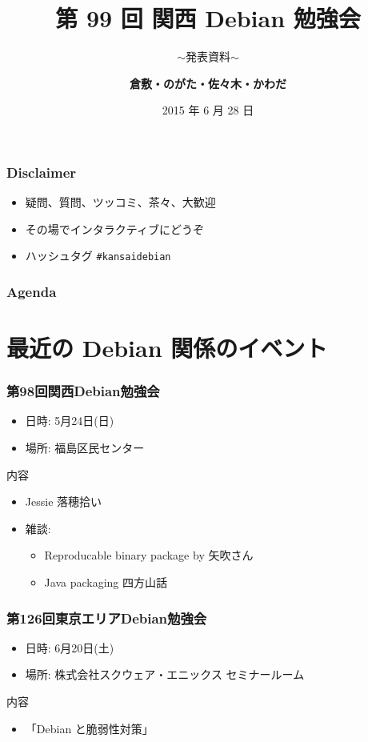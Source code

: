 \documentclass[cjk,dvipdfmx,10pt,compress,%
hyperref={bookmarks=true,bookmarksnumbered=true,bookmarksopen=false,%
  colorlinks=false,%
  pdftitle={第 99 回 関西 Debian 勉強会},%
  pdfauthor={倉敷・のがた・佐々木・かわだ},%
  pdfsubject={資料},%
}]{beamer}
\title{第 99 回 関西 Debian 勉強会}
\subtitle{$\sim$発表資料$\sim$}
\author[%
倉敷, のがた, 佐々木, かわだ]{%
  {\large{\textbf{倉敷・のがた・佐々木・かわだ}}}}
\institute[Debian JP]{\normalsize{関西 Debian 勉強会}}
\date{{\small{2015 年 6 月 28 日}}}
\begin{document}
\settitleslide
\begin{frame}
  \titlepage
\end{frame}
\setdefaultslide

\begin{frame}[fragile]
  \frametitle{Disclaimer}
  \begin{itemize}
  \item 疑問、質問、ツッコミ、茶々、\alert{大歓迎}
  \item その場でインタラクティブにどうぞ
  \item ハッシュタグ \texttt{\#kansaidebian}
  \end{itemize}
\end{frame}

\begin{frame}[fragile]
\frametitle{Agenda}

\tableofcontents

\end{frame}

\section{最近の Debian 関係のイベント}


\begin{frame}[fragile]
  \frametitle{第98回関西Debian勉強会}
  \begin{itemize}
  \item 日時: 5月24日(日)
  \item 場所: 福島区民センター
  \end{itemize}
  \begin{block}{内容}
    \begin{itemize}
    \item Jessie 落穂拾い
    \item 雑談:
      \begin{itemize}
      \item Reproducable binary package by 矢吹さん
      \item Java packaging 四方山話
      \end{itemize}
    \end{itemize}
  \end{block}
\end{frame}

\begin{frame}[fragile]
  \frametitle{第126回東京エリアDebian勉強会}
  \begin{itemize}
  \item 日時: 6月20日(土)
  \item 場所: 株式会社スクウェア・エニックス セミナールーム
  \end{itemize}
  \begin{block}{内容}
    \begin{itemize}
    \item 「Debian と脆弱性対策」
    \end{itemize}
  \end{block}
\end{frame}
\end{document}
